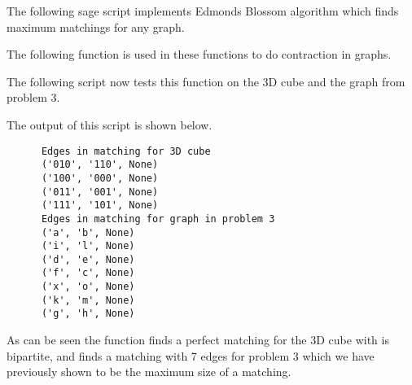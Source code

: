 \documentclass[11pt, oneside]{article}
\begin{document}
\begin{enumerate}
    The following sage script implements Edmonds Blossom algorithm which finds
    maximum matchings for any graph.

    
    The following function is used in these functions to do contraction in
    graphs.
    

    The following script now tests this function on the 3D cube and the graph
    from problem 3.
    
    The output of this script is shown below.
    \begin{verbatim}
      Edges in matching for 3D cube
      ('010', '110', None)
      ('100', '000', None)
      ('011', '001', None)
      ('111', '101', None)
      Edges in matching for graph in problem 3
      ('a', 'b', None)
      ('i', 'l', None)
      ('d', 'e', None)
      ('f', 'c', None)
      ('x', 'o', None)
      ('k', 'm', None)
      ('g', 'h', None)
    \end{verbatim}
    As can be seen the function finds a perfect matching for the 3D cube with is
    bipartite, and finds a matching with 7 edges for problem 3 which we have
    previously shown to be the maximum size of a matching.
\end{enumerate}
\end{document}
